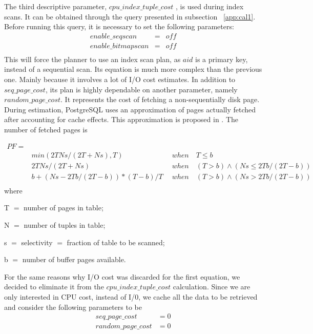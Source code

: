 The third descriptive parameter, $cpu\_index\_tuple\_cost$ , is used during index scans. It can be obtained through the query presented in subsection ~\ref{app:cal1}. Before running this query, it is necessary to set the following parameters:
\begin{eqnarray*}
 enable\_seqscan&=&off \\
 enable\_bitmapscan&=&off \\
\end{eqnarray*}
This will force the planner to use an index scan plan, as $aid$ is a primary key, instead of a sequential scan. Its equation is much more complex than the previous one. Mainly because it involves a lot of I/O cost estimates. In addition to $seq\_page\_cost$, its plan is highly dependable on another parameter, namely $random\_page\_cost$. It represents the cost of fetching a non-sequentially disk page. During estimation, PostgreSQL uses an approximation of pages actually fetched after accounting for cache effects. This approximation is proposed in \cite{Mackert:1989:ISU:68012.68016}. The number of fetched pages is

\begin{eqnarray*}
  PF=&& \\
  &min(2TNs/(2T+Ns),T)\qquad \qquad \qquad & when\quad T \le b \\
  &2TNs/(2T+Ns) & when \quad (T > b) \wedge (Ns \le 2Tb/(2T-b)) \\
  &b + (Ns -2Tb/(2T-b))*(T-b)/T & when \quad (T > b) \wedge (Ns > 2Tb/(2T-b)) \\
\end{eqnarray*}
where
\begin{description}
 \item T $=$ number of pages in table;
 \item N $=$ number of tuples in table;
 \item s $=$ selectivity $=$ fraction of table to be scanned;
 \item b $=$ number of buffer pages available.
\end{description}

For the same reasons why I/O cost was discarded for the first equation, we decided to eliminate it from the $cpu\_index\_tuple\_cost$ calculation. Since we are only interested in CPU cost, instead of I/0, we cache all the data to be retrieved and consider the following parameters to be
\begin{equation}
 \begin{split}
  seq\_page\_cost &= 0 \\
  random\_page\_cost &= 0
 \end{split}
\end{equation}

